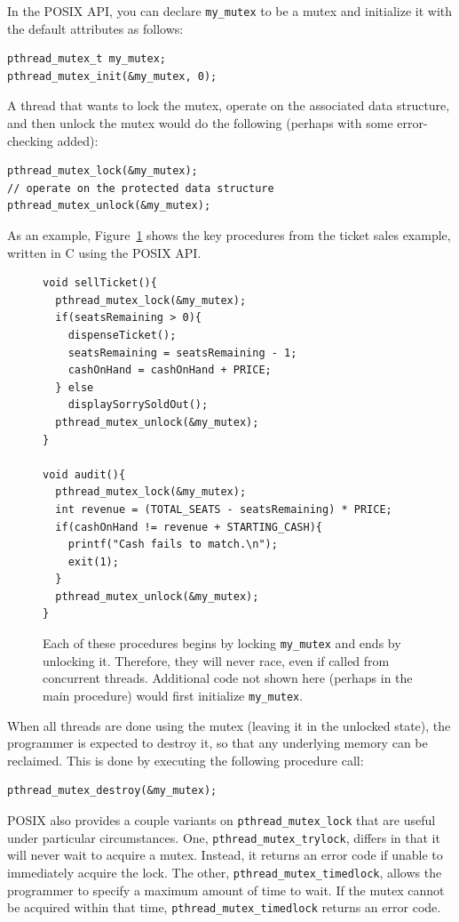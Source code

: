 In the POSIX API, you can declare \verb|my_mutex| to be a mutex and
initialize it with the default attributes as follows:
%
%
\begin{verbatim}
pthread_mutex_t my_mutex;
pthread_mutex_init(&my_mutex, 0);
\end{verbatim}
A thread that wants to lock the mutex, operate on the associated data
structure, and then unlock the mutex would do the following (perhaps
with some error-checking added):
%
%
\begin{verbatim}
pthread_mutex_lock(&my_mutex);
// operate on the protected data structure
pthread_mutex_unlock(&my_mutex);
\end{verbatim}
As an example, Figure~\ref{tickets-pthreads-code} shows the key
procedures from the ticket sales example, written in C using the POSIX API.
\begin{figure}
\begin{verbatim}
void sellTicket(){
  pthread_mutex_lock(&my_mutex);
  if(seatsRemaining > 0){
    dispenseTicket();
    seatsRemaining = seatsRemaining - 1;
    cashOnHand = cashOnHand + PRICE;
  } else
    displaySorrySoldOut();
  pthread_mutex_unlock(&my_mutex);
}

void audit(){
  pthread_mutex_lock(&my_mutex);
  int revenue = (TOTAL_SEATS - seatsRemaining) * PRICE;
  if(cashOnHand != revenue + STARTING_CASH){
    printf("Cash fails to match.\n");
    exit(1);
  }
  pthread_mutex_unlock(&my_mutex);
}
\end{verbatim}
\caption{Each of these procedures begins by locking {\tt my\_mutex} and
  ends by unlocking it.  Therefore, they will never race, even if
  called from concurrent threads. Additional code not shown here
  (perhaps in the main procedure) would first initialize {\tt my\_mutex}.}
\label{tickets-pthreads-code}
\end{figure}
When all threads are done using the mutex (leaving it in the unlocked
state), the programmer is expected to destroy it, so that any
underlying memory can be reclaimed.  This is done by
executing the following procedure call:
%
\begin{verbatim}
pthread_mutex_destroy(&my_mutex);
\end{verbatim}

POSIX also provides a couple variants on \verb|pthread_mutex_lock|
that are useful under particular circumstances.  One,
\verb|pthread_mutex_trylock|, differs in that it will never wait to
acquire a mutex. Instead, it returns an error code if unable to
immediately acquire the lock.  The other,
\verb|pthread_mutex_timedlock|, allows the programmer to specify a
maximum amount of time to wait.  If the mutex cannot be acquired
within that time, \verb|pthread_mutex_timedlock| returns an error
code.

